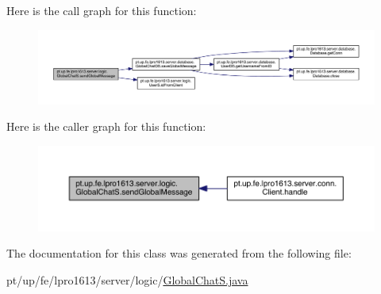 Here is the call graph for this function\+:
\nopagebreak
\begin{figure}[H]
\begin{center}
\leavevmode
\includegraphics[width=350pt]{classpt_1_1up_1_1fe_1_1lpro1613_1_1server_1_1logic_1_1_global_chat_s_add5e38be43ae6a703ba3865221171ca5_cgraph}
\end{center}
\end{figure}
Here is the caller graph for this function\+:
\nopagebreak
\begin{figure}[H]
\begin{center}
\leavevmode
\includegraphics[width=350pt]{classpt_1_1up_1_1fe_1_1lpro1613_1_1server_1_1logic_1_1_global_chat_s_add5e38be43ae6a703ba3865221171ca5_icgraph}
\end{center}
\end{figure}


The documentation for this class was generated from the following file\+:\begin{DoxyCompactItemize}
\item 
pt/up/fe/lpro1613/server/logic/\hyperlink{_global_chat_s_8java}{Global\+Chat\+S.\+java}\end{DoxyCompactItemize}
